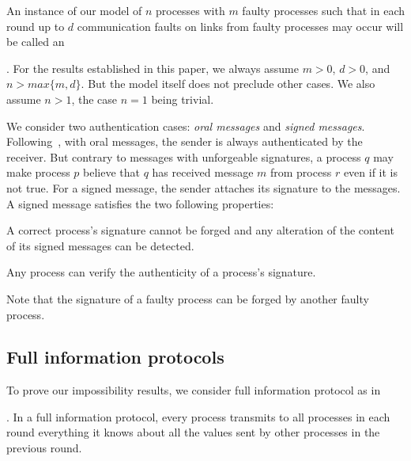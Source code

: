 An instance of our model of $n$ processes with $m$ 
faulty processes such that in each round up to $d$ communication faults
on links from faulty processes may occur will be called an {. For the results established in this paper, we always assume $m>0$, $d>0$, and $n > 
max\{m,d\}$. But the model itself does not preclude other cases. We also assume $n>1$, the case $n=1$ being trivial. 

\vspace{1em}
 We consider two authentication cases:
 \emph{oral messages} and \emph{signed messages}.
Following~\cite{lamport1982byzantine,srikanth1987optimal}, with oral messages, the
sender is always
authenticated by the receiver. But contrary to messages with
unforgeable signatures, a process $q$ may make process $p$ believe that $q$ has received
message $m$ from process $r$ even if it is not true.
For a signed message,  the sender attaches its
signature to the messages. 
A signed message satisfies the two following properties: 

\begin{enumeratealpha}
  \item A correct process's signature cannot be
    forged and any alteration of the content of its signed messages
    can be detected. 
  \item Any process can verify the authenticity of a process's
    signature. 
\end{enumeratealpha}
Note that the signature of a faulty process can be forged by
another faulty process. 

\subsection{Full information protocols}
To prove our impossibility results, we consider full information protocol as in 
{\cite{fischer1982lower,lamport1982byzantine,lynch1996distributed}. In a full information
protocol, every process transmits to all processes in each round everything it knows
about all the values sent by other processes in the previous round.

}}
